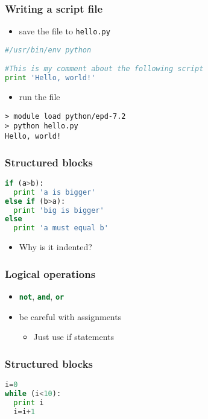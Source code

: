 \documentclass[xcolor=table,10pt,final]{beamer}
\begin{document}
\begin{frame}[fragile]
  \frametitle{Writing a script file}
  \begin{itemize}
    \item save the file to {\tt hello.py}
  \end{itemize}
\begin{lstlisting}[language=Python]
#/usr/bin/env python

#This is my comment about the following script
print 'Hello, world!'
\end{lstlisting}
\begin{itemize}
  \item run the file
\end{itemize}
\begin{verbatim}
> module load python/epd-7.2
> python hello.py
Hello, world!
\end{verbatim}
\end{frame}

\begin{frame}[fragile]
  \frametitle{Structured blocks}
  \begin{lstlisting}[language=Python]
if (a>b):
  print 'a is bigger'
else if (b>a):
  print 'big is bigger'
else
  print 'a must equal b'
\end{lstlisting}
\begin{itemize}
  \item<2-> Why is it indented?
\end{itemize}
\end{frame}
\begin{frame}
  \frametitle{Logical operations}
  \begin{itemize}
    \item \lstinline[language=Python]|not|, \lstinline[language=Python]|and|, \lstinline[language=Python]|or|
    \item be careful with assignments
      \begin{itemize}
        \item Just use if statements
      \end{itemize}
  \end{itemize}
\end{frame}

\begin{frame}[fragile]
  \frametitle{Structured blocks}
  \begin{lstlisting}[language=Python]
i=0
while (i<10):
  print i
  i=i+1
\end{lstlisting}
\end{frame}
\end{document}
